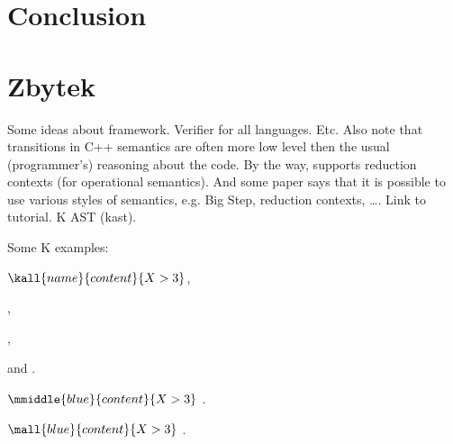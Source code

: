 \documentclass[nolot,nolof,nocover,printed]{fithesis3}
\begin{document}






\chapter{Conclusion}
	
\chapter{Zbytek}

Some ideas about \K framework. Verifier for all languages. Etc. Also note that transitions in C++ semantics are often more low level then the usual (programmer's) reasoning about the code. By the way, \K supports reduction contexts (for operational semantics). And some \K paper says that it is possible to use various styles of semantics, e.g. Big Step, reduction contexts, \ldots . Link to \K tutorial. K AST (kast).


\ifshowkexamples
Some K examples:

$\kall{name}{content}{X > 3}$,

,

,

and .

$\mmiddle{blue}{content}{X > 3}$
.

$\mall{blue}{content}{X > 3}$
.


\fi %

\fi %


 
\end{document}
